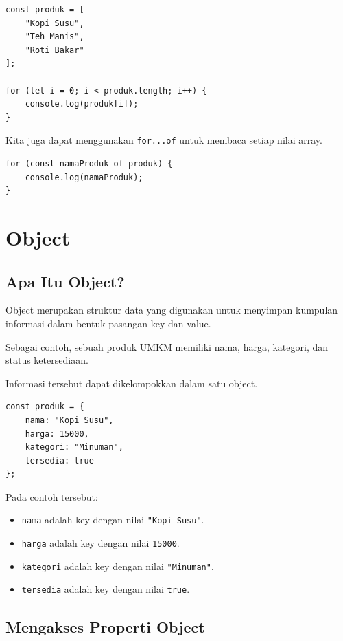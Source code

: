 \documentclass[12pt,a4paper]{article}
\begin{document}
\begin{lstlisting}
const produk = [
    "Kopi Susu",
    "Teh Manis",
    "Roti Bakar"
];

for (let i = 0; i < produk.length; i++) {
    console.log(produk[i]);
}
\end{lstlisting}

Kita juga dapat menggunakan \texttt{for...of}
untuk membaca setiap nilai array.

\begin{lstlisting}
for (const namaProduk of produk) {
    console.log(namaProduk);
}
\end{lstlisting}

\section{Object}

\subsection{Apa Itu Object?}

Object merupakan struktur data yang digunakan
untuk menyimpan kumpulan informasi dalam bentuk
pasangan key dan value.

Sebagai contoh, sebuah produk UMKM memiliki
nama, harga, kategori, dan status ketersediaan.

Informasi tersebut dapat dikelompokkan dalam
satu object.

\begin{lstlisting}
const produk = {
    nama: "Kopi Susu",
    harga: 15000,
    kategori: "Minuman",
    tersedia: true
};
\end{lstlisting}

Pada contoh tersebut:

\begin{itemize}
    \item \texttt{nama} adalah key dengan nilai
    \texttt{"Kopi Susu"}.
    \item \texttt{harga} adalah key dengan nilai
    \texttt{15000}.
    \item \texttt{kategori} adalah key dengan nilai
    \texttt{"Minuman"}.
    \item \texttt{tersedia} adalah key dengan nilai
    \texttt{true}.
\end{itemize}

\subsection{Mengakses Properti Object}
\end{document}
